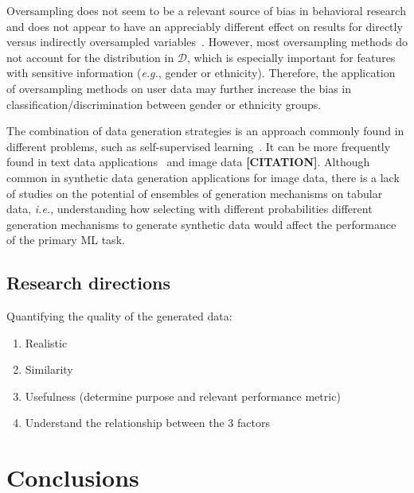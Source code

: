 \documentclass[parskip=full]{scrartcl}
\begin{document}
Oversampling does not seem to be a relevant source of bias in behavioral
research and does not appear to have an appreciably different effect on
results for directly versus indirectly oversampled
variables~\cite{hauner2014latent}. However, most oversampling methods do not
account for the distribution in $\mathcal{D}$, which is especially important
for features with sensitive information (\textit{e.g.}, gender or ethnicity).
Therefore, the application of oversampling methods on user data may further
increase the bias in classification/discrimination between gender or ethnicity
groups.


The combination of data generation strategies is an approach commonly found in
different problems, such as self-supervised
learning~\cite{grill2020bootstrap}. It can be more frequently found in text
data applications~\cite{bayer2021survey} and image data \textbf{[CITATION]}.
Although common in synthetic data generation applications for image data,
there is a lack of studies on the potential of ensembles of generation
mechanisms on tabular data, \textit{i.e.}, understanding how selecting with
different probabilities different generation mechanisms to generate synthetic
data would affect the performance of the primary ML task.



% 

\subsection{Research directions}


Quantifying the quality of the generated data:

\begin{enumerate}
    \item Realistic
    \item Similarity
    \item Usefulness (determine purpose and relevant performance metric)
    \item Understand the relationship between the 3 factors
\end{enumerate}

\section{Conclusions}~\label{sec:conclusions}

\printbibliography
\end{document}
